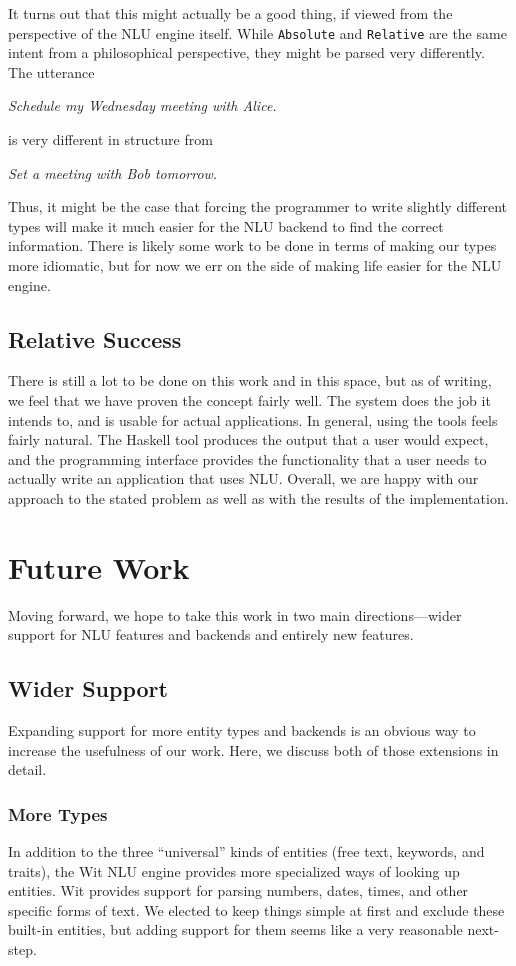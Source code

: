 \documentclass[twocolumn]{article}
\newcommand{\ts}[1]{\texttt{#1}}
\begin{document}
It turns out that this might actually be a good thing, if viewed from the
perspective of the NLU engine itself. While \ts{Absolute} and \ts{Relative} are
the same intent from a philosophical perspective, they might be parsed very
differently. The utterance
\begin{center}
  \emph{Schedule my Wednesday meeting with Alice.}
\end{center}
is very different in structure from
\begin{center}
  \emph{Set a meeting with Bob tomorrow.}
\end{center}
Thus, it might be the case that forcing the programmer to write slightly
different types will make it much easier for the NLU backend to find the correct
information. There is likely some work to be done in terms of making our types
more idiomatic, but for now we err on the side of making life easier for the NLU
engine.

\subsection{Relative Success}
There is still a lot to be done on this work and in this space, but as of
writing, we feel that we have proven the concept fairly well. The system does
the job it intends to, and is usable for actual applications. In general, using
the tools feels fairly natural. The Haskell tool produces the output that a user
would expect, and the programming interface provides the functionality that a
user needs to actually write an application that uses NLU. Overall, we are happy
with our approach to the stated problem as well as with the results of the
implementation.

\section{Future Work} \label{future}
Moving forward, we hope to take this work in two main directions---wider support
for NLU features and backends and entirely new features.

\subsection{Wider Support}
Expanding support for more entity types and backends is an obvious way to
increase the usefulness of our work. Here, we discuss both of those extensions
in detail.

\subsubsection{More Types} \label{future>types}
In addition to the three ``universal'' kinds of entities (free text, keywords,
and traits), the Wit NLU engine provides more specialized ways of looking up
entities. Wit provides support for parsing numbers, dates, times, and other
specific forms of text. We elected to keep things simple at first and exclude
these built-in entities, but adding support for them seems like a very
reasonable next-step.
\end{document}
